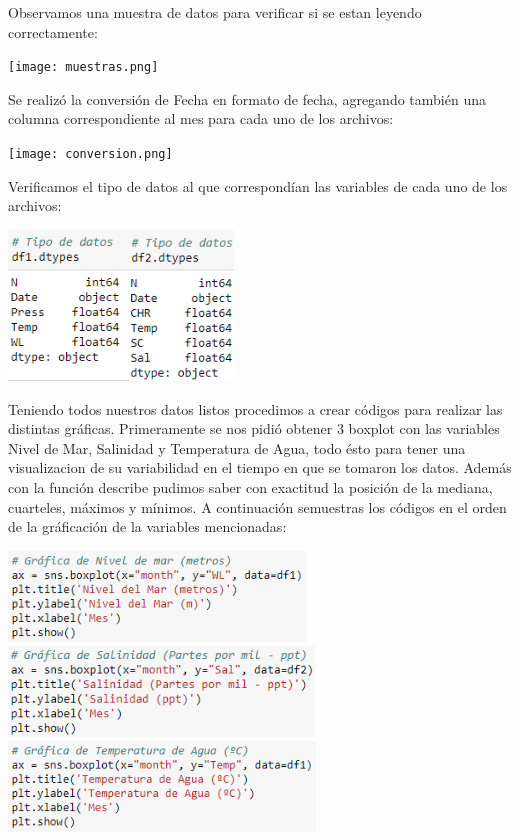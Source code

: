 \documentclass[12pt]{article}
\begin{document}
Observamos una muestra de datos para verificar si se estan leyendo correctamente:
\begin{center}
	\texttt{[image: muestras.png]}
\end{center}
Se realizó la conversión de Fecha en formato de fecha, agregando también una columna correspondiente al mes para cada uno de los archivos:
\begin{center}
	\texttt{[image: conversion.png]}
\end{center}
\newpage
Verificamos el tipo de datos al que correspondían las variables de cada uno de los archivos:
\begin{center}
	\includegraphics[height=4cm]{tipo.png}
\end{center}
Teniendo todos nuestros datos listos procedimos a crear códigos para realizar las distintas gráficas. Primeramente se nos pidió obtener 3 boxplot con las variables Nivel de Mar, Salinidad y Temperatura de Agua, todo ésto para tener una visualizacion de su variabilidad en el tiempo en que se tomaron los datos. Además con la función describe pudimos saber con exactitud la posición de la mediana, cuarteles, máximos y mínimos.  A continuación semuestras los códigos en el orden de la gráficación de la variables mencionadas:
\begin{center}
	\includegraphics[height=2.4cm]{b1.png}
    \includegraphics[height=2.4cm]{b2.png}
    \includegraphics[height=2.4cm]{b3.png}
\end{center}
\end{document}
